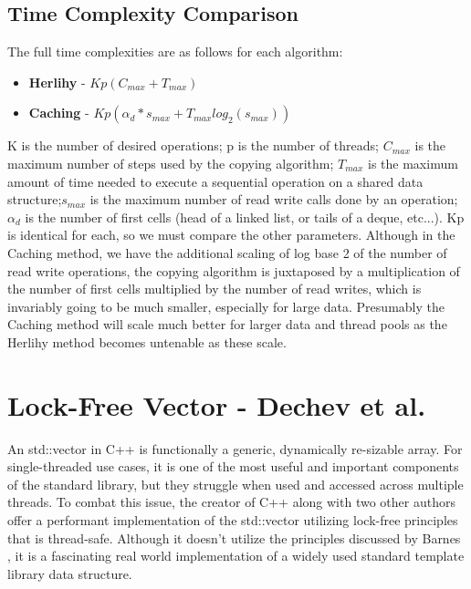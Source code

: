 \documentclass{article}
\begin{document}
\subsection*{Time Complexity Comparison}
The full time complexities are as follows for each algorithm:
\begin{itemize}
    \item \textbf{Herlihy} - \(Kp(C_{max} + T_{max})\)
    \item \textbf{Caching} - \(Kp(\alpha_{d} * s_{max} + T_{max}log_{2}(s_{max}))\)
\end{itemize}
K is the number of desired operations; p is the number of threads; \(C_{max}\) is the maximum number of steps used by the copying algorithm; \(T_{max}\) is the maximum amount of time needed to execute a sequential operation on a shared data structure;\(s_{max}\) is the maximum number of read write calls done by an operation; \(\alpha_{d}\) is the number of first cells (head of a linked list, or tails of a deque, etc...).
\newline
\newline
Kp is identical for each, so we must compare the other parameters. Although in the Caching method, we have the additional scaling of log base 2 of the number of read write operations, the copying algorithm is juxtaposed by a multiplication of the number of first cells multiplied by the number of read writes, which is invariably going to be much smaller, especially for large data. Presumably the Caching method will scale much better for larger data and thread pools as the Herlihy method becomes untenable as these scale.

\section*{Lock-Free Vector - Dechev et al. \cite{Dechev}}
An std::vector in C++ is functionally a generic, dynamically re-sizable array. For single-threaded use cases, it is one of the most useful and important components of the standard library, but they struggle when used and accessed across multiple threads. To combat this issue, the creator of C++ along with two other authors offer a performant implementation of the std::vector utilizing lock-free principles that is thread-safe. Although it doesn't utilize the principles discussed by Barnes \cite{Barnes}, it is a fascinating real world implementation of a widely used standard template library data structure.
\end{document}
